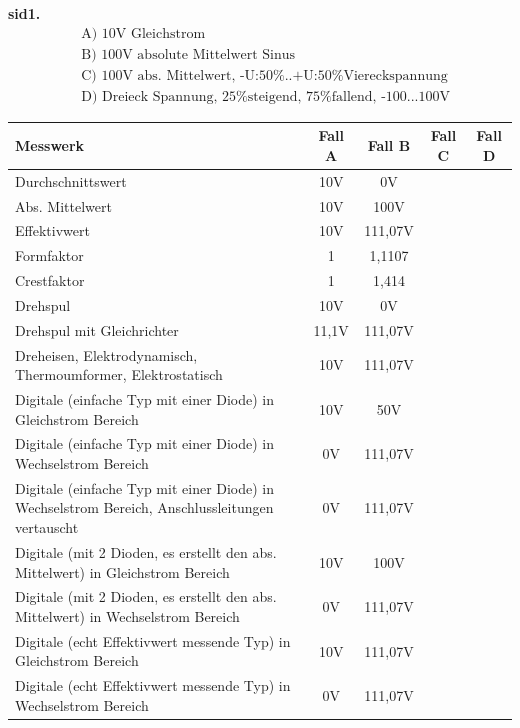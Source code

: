 \documentclass[fleqn,12pt]{article}
\begin{document}
\textbf{sid1.}
\begin{align*}
&\text{A) 10V Gleichstrom} \\
&\text{B) 100V absolute Mittelwert Sinus} \\
&\text{C) 100V abs. Mittelwert, -U:50\%..+U:50\% Viereckspannung} \\
&\text{D) Dreieck Spannung, 25\% steigend, 75\% fallend, -100...100V}
\end{align*}
\begin{table}[htpb]
\centering
\renewcommand{\arraystretch}{1.3} %
\begin{tabularx}{\textwidth}{|X|c|c|c|c|}
\hline
\textbf{Messwerk} & \textbf{Fall A} & \textbf{Fall B} & \textbf{Fall C} & \textbf{Fall D} \\ \hline
Durchschnittswert & 10V & 0V & & \\ \hline
Abs. Mittelwert & 10V & 100V & & \\ \hline
Effektivwert & 10V & 111,07V & & \\ \hline
Formfaktor & 1 & 1,1107 & & \\ \hline
Crestfaktor & 1 & 1,414 & & \\ \hline
Drehspul & 10V & 0V & & \\ \hline
Drehspul mit Gleichrichter & 11,1V & 111,07V & & \\ \hline
Dreheisen, Elektrodynamisch, Thermoumformer, Elektrostatisch & 10V & 111,07V & & \\ \hline
Digitale (einfache Typ mit einer Diode) in Gleichstrom Bereich & 10V & 50V & & \\ \hline
Digitale (einfache Typ mit einer Diode) in Wechselstrom Bereich & 0V & 111,07V & & \\ \hline
Digitale (einfache Typ mit einer Diode) in Wechselstrom Bereich, Anschlussleitungen vertauscht & 0V & 111,07V & & \\ \hline
Digitale (mit 2 Dioden, es erstellt den abs. Mittelwert) in Gleichstrom Bereich & 10V & 100V & & \\ \hline
Digitale (mit 2 Dioden, es erstellt den abs. Mittelwert) in Wechselstrom Bereich & 0V & 111,07V & & \\ \hline
Digitale (echt Effektivwert messende Typ) in Gleichstrom Bereich & 10V & 111,07V & & \\ \hline
Digitale (echt Effektivwert messende Typ) in Wechselstrom Bereich & 0V & 111,07V & & \\ \hline
\end{tabularx}
\end{table}
\pagebreak
\end{document}
